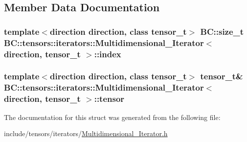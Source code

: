 \subsection{Member Data Documentation}
\subsubsection[{\texorpdfstring{index}{index}}]{\setlength{\rightskip}{0pt plus 5cm}template$<$direction direction, class tensor\+\_\+t$>$ {\bf B\+C\+::size\+\_\+t} {\bf B\+C\+::tensors\+::iterators\+::\+Multidimensional\+\_\+\+Iterator}$<$ {\bf direction}, tensor\+\_\+t $>$\+::index}\hypertarget{structBC_1_1tensors_1_1iterators_1_1Multidimensional__Iterator_af979c046e9e21c8b1624405069490962}{}\label{structBC_1_1tensors_1_1iterators_1_1Multidimensional__Iterator_af979c046e9e21c8b1624405069490962}
\subsubsection[{\texorpdfstring{tensor}{tensor}}]{\setlength{\rightskip}{0pt plus 5cm}template$<$direction direction, class tensor\+\_\+t$>$ tensor\+\_\+t\& {\bf B\+C\+::tensors\+::iterators\+::\+Multidimensional\+\_\+\+Iterator}$<$ {\bf direction}, tensor\+\_\+t $>$\+::tensor}\hypertarget{structBC_1_1tensors_1_1iterators_1_1Multidimensional__Iterator_a278ffdb16ff61939d9f995c6664b7dbc}{}\label{structBC_1_1tensors_1_1iterators_1_1Multidimensional__Iterator_a278ffdb16ff61939d9f995c6664b7dbc}


The documentation for this struct was generated from the following file\+:\begin{DoxyCompactItemize}
\item 
include/tensors/iterators/\hyperlink{Multidimensional__Iterator_8h}{Multidimensional\+\_\+\+Iterator.\+h}\end{DoxyCompactItemize}
